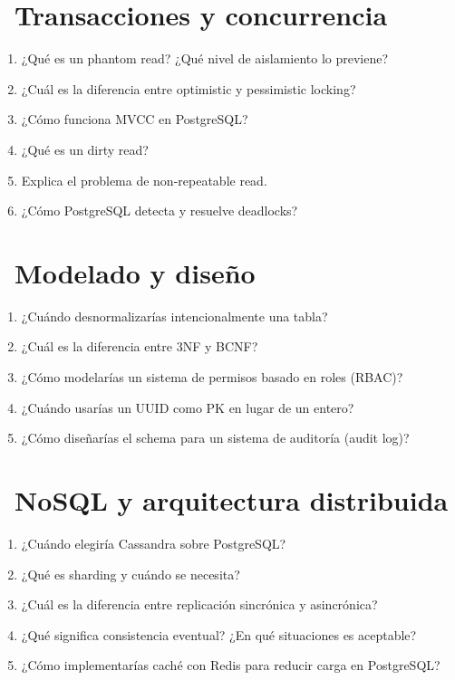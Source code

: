 \section[\emj{🎤} Transacciones y concurrencia]{~Transacciones y concurrencia}

\begin{entrevistabox}
\begin{enumerate}
  \item ¿Qué es un phantom read? ¿Qué nivel de aislamiento lo previene?
  \item ¿Cuál es la diferencia entre optimistic y pessimistic locking?
  \item ¿Cómo funciona MVCC en PostgreSQL?
  \item ¿Qué es un dirty read?
  \item Explica el problema de non-repeatable read.
  \item ¿Cómo PostgreSQL detecta y resuelve deadlocks?
\end{enumerate}
\end{entrevistabox}

\section[\emj{🎤} Modelado y diseño]{~Modelado y diseño}

\begin{entrevistabox}
\begin{enumerate}
  \item ¿Cuándo desnormalizarías intencionalmente una tabla?
  \item ¿Cuál es la diferencia entre 3NF y BCNF?
  \item ¿Cómo modelarías un sistema de permisos basado en roles (RBAC)?
  \item ¿Cuándo usarías un UUID como PK en lugar de un entero?
  \item ¿Cómo diseñarías el schema para un sistema de auditoría (audit log)?
\end{enumerate}
\end{entrevistabox}

\section[\emj{🎤} NoSQL y arquitectura distribuida]{~NoSQL y arquitectura distribuida}

\begin{entrevistabox}
\begin{enumerate}
  \item ¿Cuándo elegiría Cassandra sobre PostgreSQL?
  \item ¿Qué es sharding y cuándo se necesita?
  \item ¿Cuál es la diferencia entre replicación sincrónica y asincrónica?
  \item ¿Qué significa consistencia eventual? ¿En qué situaciones es aceptable?
  \item ¿Cómo implementarías caché con Redis para reducir carga en PostgreSQL?
\end{enumerate}
\end{entrevistabox}

